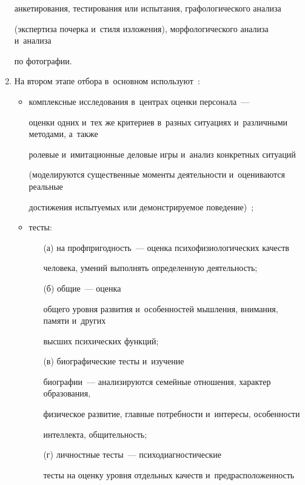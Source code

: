 \begin{multicols}{2}
\begin{enumerate}[1.]
анкетирования, тес\-ти\-ро\-ва\-ния или испытания, графологического анализа 

(экспертиза почерка и~стиля изложения), морфологического анализа и~анализа 

по фотографии.\\ [-14pt]

\item На втором этапе отбора в~основном используют~\cite{26-r, 27-r}:

\begin{itemize}

\item комплексные исследования в~цент\-рах оценки персонала~--- 

оценки одних и~тех же критериев в~разных ситуациях и~различными методами, а~также 

ролевые и~имитационные деловые игры и~анализ конкретных ситуаций 

(моделируются существенные моменты дея\-тель\-ности и~оцениваются реальные 

достижения ис\-пы\-ту\-емых или де\-монст\-ри\-ру\-емое поведение)~\cite{27-r};\\[-14pt]

\item тесты: 

\begin{itemize}

\item[(а)] на проф\-при\-год\-ность~--- оценка психофизиологических качеств 

человека, умений выполнять определенную дея\-тель\-ность;

\item[(б)] общие~--- оценка 

общего уров\-ня развития и~особенностей мыш\-ле\-ния, внимания, памяти и~других 

высших психических функций; 

\item[(в)] био\-гра\-фи\-че\-ские тес\-ты и~изучение 

био\-гра\-фии~--- анализируются семейные отношения, характер образования, 

физическое развитие, глав\-ные по\-треб\-но\-сти и~интересы, осо\-бен\-но\-сти 

интеллекта, об\-щи\-тель\-ность; 

\item[(г)] личностные тес\-ты~--- психодиагностические 

тес\-ты на оцен\-ку уровня отдельных качеств и~пред\-рас\-по\-ло\-жен\-ность 


\end{itemize}
\end{itemize}
\end{enumerate}
\end{multicols}
